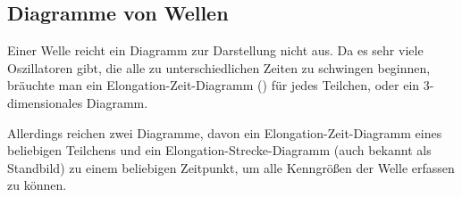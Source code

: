 




%
%	





\subsection{Diagramme von Wellen} \label{subsec:diagramm_welle}

Einer Welle reicht ein Diagramm zur Darstellung nicht aus. Da es sehr viele Oszillatoren gibt, die alle zu unterschiedlichen Zeiten zu schwingen beginnen, bräuchte man ein Elongation-Zeit-Diagramm () für jedes Teilchen, oder ein 3-dimensionales Diagramm.

Allerdings reichen zwei Diagramme, davon ein Elongation-Zeit-Diagramm eines beliebigen Teilchens und ein Elongation-Strecke-Diagramm (auch bekannt als \glqq Standbild\grqq) zu einem beliebigen Zeitpunkt, um alle Kenngrößen der Welle erfassen zu können.




